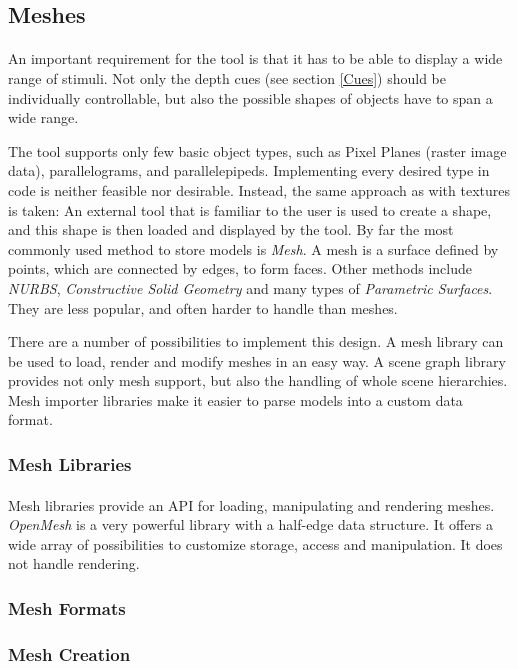 \subsection{Meshes\label{Meshes}}
\paragraph{}
An important requirement for the tool is that it has to be able to display a wide range of stimuli.
Not only the depth cues (see section \ref{Cues}) should be individually controllable, but also the possible shapes of objects have to span a wide range.

The tool supports only few basic object types, such as Pixel Planes (raster image data), parallelograms, and parallelepipeds. Implementing every desired type in code is neither feasible nor desirable.
Instead, the same approach as with textures is taken: An external tool that is familiar to the user is used to create a shape, and this shape is then loaded and displayed by the tool. By far the most commonly used method to store models is \textit{Mesh}. A mesh is a surface defined by points, which are connected by edges, to form faces. Other methods include \textit{NURBS}, \textit{Constructive Solid Geometry} and many types of \textit{Parametric Surfaces}. They are less popular, and often harder to handle than meshes.

There are a number of possibilities to implement this design. A mesh library can be used to load, render and modify meshes in an easy way. A scene graph library provides not only mesh support, but also the handling of whole scene hierarchies. Mesh importer libraries make it easier to parse models into a custom data format.


\subsubsection{Mesh Libraries}
\paragraph{}
Mesh libraries provide an API for loading, manipulating and rendering meshes. \textit{OpenMesh} is a very powerful library with a half-edge data structure. It offers a wide array of possibilities to customize storage, access and manipulation. It does not handle rendering.

\paragraph{}

\subsubsection{Mesh Formats}
\paragraph{}

\subsubsection{Mesh Creation}
\paragraph{}
